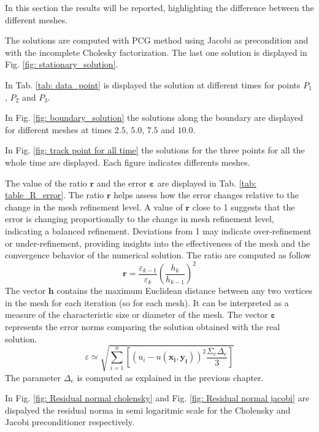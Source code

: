 In this section the results will be reported, highlighting the difference between the different meshes. 

The solutions are computed with PCG method using Jacobi as precondition and with the incomplete Cholesky factorization. The last one solution is displayed in Fig. \ref{fig: stationary_solution}.

In Tab. \ref{tab: data_point} is displayed the solution at different times for points $P_1$, $P_2$ and $P_3$.

In Fig. \ref{fig: boundary_solution} the solutions along the boundary are displayed for different meshes at times $2.5$, $5.0$, $7.5$ and $10.0$.

In Fig. \ref{fig: track point for all time} the solutions for the three points for all the whole time are displayed. Each figure indicates differents meshes.

The value of the ratio $\mathbf{r}$ and the error $\mathbf{\varepsilon}$ are displayed in Tab. \ref{tab: table_R_error}. 
The ratio $\mathbf{r}$ helps assess how the error changes relative to the change in the mesh refinement level. A value of $\mathbf{r}$ close to 1 suggests that the error is changing proportionally to the change in mesh refinement level, indicating a balanced refinement. Deviations from 1 may indicate over-refinement or under-refinement, providing insights into the effectiveness of the mesh and the convergence behavior of the numerical solution.
The ratio are computed as follow $$\mathbf{r}=\frac{\varepsilon_{k-1}}{\varepsilon_k} ( \frac{h_k}{h_{k-1}})^2$$
The vector $\mathbf{h}$ contains the maximum Euclidean distance between any two vertices in the mesh for each iteration (so for each mesh). It can be interpreted as a measure of the characteristic size or diameter of the mesh.
The vector $\mathbf{\varepsilon}$ represents the error norms comparing the solution obtained with the real solution.
$$\varepsilon \simeq \sqrt{ \sum_{i=1}^{n}[(u_i-u(\mathbf{x_i},\mathbf{y_i}))^2 \frac{\Sigma_e \Delta_e}{3}]}$$
The parameter $\Delta_e$ is computed as explained in the previous chapter.

In Fig. \ref{fig: Residual normal cholensky} and Fig. \ref{fig: Residual normal jacobi} are dispalyed the residual norma in semi logaritmic scale for the Cholensky and Jacobi preconditioner respectively.


